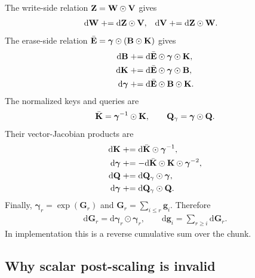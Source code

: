 The write-side relation ${\mathbf{Z}}={\mathbf{W}}\odot{\mathbf{V}}$ gives
\begin{align}
    \mathrm{d}{\mathbf{W}}
    &\mathrel{+}=
    \mathrm{d}{\mathbf{Z}}\odot{\mathbf{V}},
    &
    \mathrm{d}{\mathbf{V}}
    &\mathrel{+}=
    \mathrm{d}{\mathbf{Z}}\odot{\mathbf{W}} .
\label{eq_app_dW_dV}
\end{align}
The erase-side relation $\bar{{\mathbf{E}}}=\boldsymbol{\gamma}\odot({\mathbf{B}}\odot{\mathbf{K}})$ gives
\begin{align}
    \mathrm{d}{\mathbf{B}}
    &\mathrel{+}=
    \mathrm{d}\bar{{\mathbf{E}}}\odot\boldsymbol{\gamma}\odot{\mathbf{K}},
\label{eq_app_dB_from_E}\\
    \mathrm{d}{\mathbf{K}}
    &\mathrel{+}=
    \mathrm{d}\bar{{\mathbf{E}}}\odot\boldsymbol{\gamma}\odot{\mathbf{B}},
\label{eq_app_dK_from_E}\\
    \mathrm{d}\boldsymbol{\gamma}
    &\mathrel{+}=
    \mathrm{d}\bar{{\mathbf{E}}}\odot{\mathbf{B}}\odot{\mathbf{K}} .
\label{eq_app_dgamma_from_E}
\end{align}
The normalized keys and queries are
\begin{align}
    \bar{{\mathbf{K}}} = \boldsymbol{\gamma}^{-1}\odot{\mathbf{K}},
    \qquad
    {\mathbf{Q}}_{\gamma} = \boldsymbol{\gamma}\odot{\mathbf{Q}} .
\label{eq_app_Kbar_Qg}
\end{align}
Their vector-Jacobian products are
\begin{align}
    \mathrm{d}{\mathbf{K}}
    &\mathrel{+}=
    \mathrm{d}\bar{{\mathbf{K}}}\odot\boldsymbol{\gamma}^{-1},
\label{eq_app_dK_from_Kbar}\\
    \mathrm{d}\boldsymbol{\gamma}
    &\mathrel{+}=
    -\mathrm{d}\bar{{\mathbf{K}}}\odot{\mathbf{K}}\odot\boldsymbol{\gamma}^{-2},
\label{eq_app_dgamma_from_Kbar}\\
    \mathrm{d}{\mathbf{Q}}
    &\mathrel{+}=
    \mathrm{d}{\mathbf{Q}}_{\gamma}\odot\boldsymbol{\gamma},
\label{eq_app_dQ_from_Qg}\\
    \mathrm{d}\boldsymbol{\gamma}
    &\mathrel{+}=
    \mathrm{d}{\mathbf{Q}}_{\gamma}\odot{\mathbf{Q}} .
\label{eq_app_dgamma_from_Qg}
\end{align}
Finally, $\boldsymbol{\gamma}_r=\exp(\boldsymbol{G}_r)$ and $\boldsymbol{G}_r=\sum_{i\le r}\boldsymbol{g}_i$. Therefore
\begin{align}
    \mathrm{d}\boldsymbol{G}_r
    =
    \mathrm{d}\boldsymbol{\gamma}_r
    \odot
    \boldsymbol{\gamma}_r,
    \qquad
    \mathrm{d}\boldsymbol{g}_i
    =
    \sum_{r\ge i}
    \mathrm{d}\boldsymbol{G}_r .
\label{eq_app_dg_reverse_cumsum}
\end{align}
In implementation this is a reverse cumulative sum over the chunk.

\subsection{Why scalar post-scaling is invalid}
\label{app_no_post_scaling}


